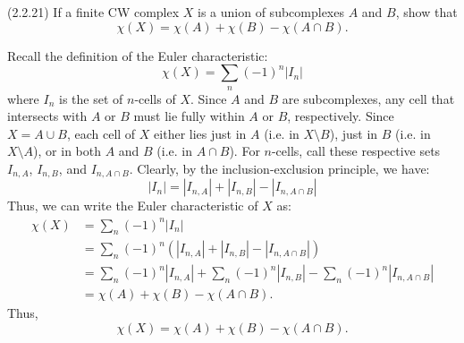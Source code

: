\documentclass[12pt]{article}
\begin{document}
\begin{problem}{3}(2.2.21) 
    If a finite CW complex $X$ is a union of subcomplexes $A$ and $B$, show that 
\[ \chi(X) = \chi(A) + \chi(B) - \chi(A \cap B). \]
\end{problem}
\begin{solution}
    Recall the definition of the Euler characteristic:
    \[ \chi(X) = \sum_n (-1)^n |I_n| \]
    where $I_n$ is the set of $n$-cells of $X$. Since $A$ and $B$ are subcomplexes, any cell that intersects with $A$ or $B$ must lie fully within $A$ or $B$, respectively. Since $X = A \cup B$, each cell of $X$ either lies just in $A$ (i.e. in $X\setminus B$), just in $B$ (i.e. in $X\setminus A$), or in both $A$ and $B$ (i.e. in $A \cap B$). For $n$-cells, call these respective sets $I_{n, A}$, $I_{n, B}$, and $I_{n, A \cap B}$. Clearly, by the inclusion-exclusion principle, we have: 
    \[ |I_n| = |I_{n, A}| + |I_{n, B}| - |I_{n, A\cap B}|\]
    Thus, we can write the Euler characteristic of $X$ as:
    \begin{align*}
    \chi(X) &= \sum_n (-1)^n |I_n| \\
    &= \sum_n (-1)^n \left( |I_{n, A}| + |I_{n, B}| - |I_{n, A\cap B}| \right) \\
    &= \sum_n (-1)^n |I_{n, A}| + \sum_n (-1)^n |I_{n, B}| - \sum_n (-1)^n |I_{n, A\cap B}| \\
    &= \chi(A) + \chi(B) - \chi(A \cap B).
    \end{align*}
    Thus, 
    \[ \chi(X) = \chi(A) + \chi(B) - \chi(A \cap B). \]
\end{solution}
\newpage
\end{document}
